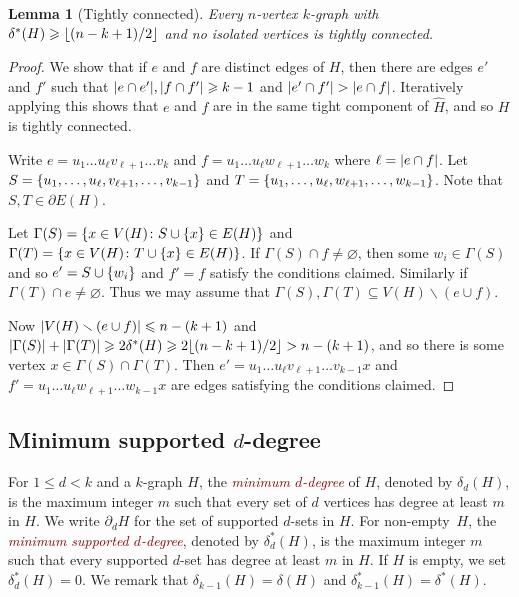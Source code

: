 \documentclass[12pt,reqno]{amsart}
\theoremstyle{plain}
\newtheorem{lemma}[theorem]{Lemma}
\theoremstyle{definition}
\numberwithin{equation}{section}
\DeclarePairedDelimiter{\abs}{\lvert}{\rvert}
\DeclarePairedDelimiter{\floor}{\lfloor}{\rfloor}
\DeclarePairedDelimiter{\set}{\{}{\}}
\renewcommand{\geq}{\geqslant}
\renewcommand{\leq}{\leqslant}
\renewcommand{\emptyset}{\varnothing}
\renewcommand{\setminus}{\smallsetminus}
\newcommand{\defn}[1]{\textcolor{Maroon}{\emph{#1}}}
\newcommand{\comin}{\delta^{\ast}}
\begin{document}
	
	\begin{lemma}[Tightly connected]\label{lem:dirac-to-tightly-connected}
		Every $n$-vertex $k$-graph with $\comin(H) \geq \floor{(n - k + 1)/2}$ and no isolated vertices is tightly connected.
	\end{lemma}
	
	\begin{proof}
		We show that if $e$ and $f$ are distinct edges of $H$, then there are edges $e'$ and $f'$ such that $\abs{e \cap e'}, \abs{f \cap f'} \geq k - 1$ and $\abs{e' \cap f'} > \abs{e \cap f}$. Iteratively applying this shows that $e$ and $f$ are in the same tight component of $\hat{H}$, and so $H$ is tightly connected.
		
		Write $e = u_1 \dotsc u_\ell v_{\ell + 1} \dotsc v_k$ and $f = u_1 \dotsc u_\ell w_{\ell + 1} \dotsc w_k$ where $\ell = \abs{e \cap f}$. Let $S = \set{u_1, \dotsc, u_\ell, v_{\ell + 1}, \dotsc, v_{k - 1}}$ and $T = \set{u_1, \dotsc, u_\ell, w_{\ell + 1}, \dotsc, w_{k - 1}}$. Note that $S, T \in \partial E(H)$.
		
		Let $\Gamma(S) = \set{x \in V(H) \colon S \cup \set{x} \in E(H)}$ and $\Gamma(T) = \set{x \in V(H) \colon T \cup \set{x} \in E(H)}$. If $\Gamma(S) \cap f \neq \emptyset$, then some $w_i \in \Gamma(S)$ and so $e' = S \cup \set{w_i}$ and $f' = f$ satisfy the conditions claimed. Similarly if $\Gamma(T) \cap e \neq \emptyset$. Thus we may assume that $\Gamma(S), \Gamma(T) \subseteq V(H) \setminus (e \cup f)$.
		
		Now $\abs{V(H) \setminus (e \cup f)} \leq n - (k + 1)$ and $\abs{\Gamma(S)} + \abs{\Gamma(T)} \geq 2\comin(H) \geq 2\floor{(n - k + 1)/2} > n - (k + 1)$, and so there is some vertex $x \in \Gamma(S) \cap \Gamma(T)$. Then $e' = u_1 \dotsc u_\ell v_{\ell + 1} \dotsc v_{k - 1} x$ and $f' = u_1 \dotsc u_\ell w_{\ell + 1} \dotsc w_{k - 1} x$ are edges satisfying the conditions claimed.
	\end{proof}
	
	\subsection{Minimum supported \texorpdfstring{$d$}{d}-degree}
	
	For $1 \leq d < k$ and a $k$-graph $H$, the \defn{minimum $d$-degree} of $H$, denoted by $\delta_d(H)$, is the maximum integer $m$ such that every set of $d$ vertices has degree at least $m$ in $H$.
	We write $\partial_d H$ for the set of supported $d$-sets in $H$.
	For non-empty~$H$, the \defn{minimum supported $d$-degree}, denoted by $\comin_d(H)$, is the maximum integer $m$ such that every supported $d$-set has degree at least $m$ in $H$.
	If $H$ is empty, we set $\comin_d(H)=0$.
	We remark that $\delta_{k - 1}(H) = \delta(H)$ and $\comin_{k - 1}(H)=\comin(H)$.
	
\end{document}

